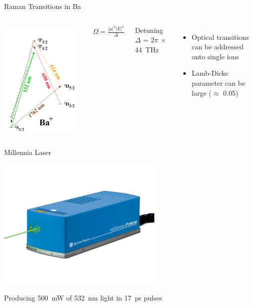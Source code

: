 \documentclass{beamer}
\begin{document}
\begin{frame}{Raman Transitions in Ba}
\begin{columns}[c]
	\includegraphics[width=0.9\textwidth]{ionized-Ba-raman}
	\centerline{$ \Omega = \frac{ \left| \mu \right|^2 \left| E \right|^2}{ \Delta }$}
	\centerline{Detuning $\Delta$ = 2$\pi$ $\times$ 44~THz}
	\hfill \break
	\begin{itemize}
		\item Optical transitions can be addressed onto single ions
		\item Lamb-Dicke parameter can be large ($\approx$ 0.05)
	\end{itemize}
\end{columns}
\end{frame}

\begin{frame}{Millennia Laser}
	\centerline{\includegraphics[width=0.6\textwidth]{Millennia}}
	\centerline{\Large Producing 500~mW of 532~nm light in 17~ps pulses}
\end{frame}
\end{document}
